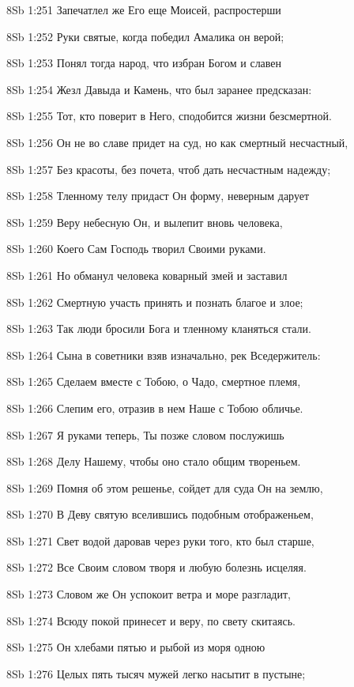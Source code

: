 \vs 8Sb 1:251 Запечатлел же Его еще Моисей, распростерши 

\vs 8Sb 1:252 Руки святые, когда победил Амалика он верой; 

\vs 8Sb 1:253 Понял тогда народ, что избран Богом и славен 

\vs 8Sb 1:254 Жезл Давыда и Камень, что был заранее предсказан: 

\vs 8Sb 1:255 Тот, кто поверит в Него, сподобится жизни безсмертной.

\vs 8Sb 1:256 Он не во славе придет на суд, но как смертный несчастный, 

\vs 8Sb 1:257 Без красоты, без почета, чтоб дать несчастным надежду; 

\vs 8Sb 1:258 Тленному телу придаст Он форму, неверным дарует 

\vs 8Sb 1:259 Веру небесную Он, и вылепит вновь человека,

\vs 8Sb 1:260 Коего Сам Господь творил Своими руками. 

\vs 8Sb 1:261 Но обманул человека коварный змей и заставил 

\vs 8Sb 1:262 Смертную участь принять и познать благое и злое; 

\vs 8Sb 1:263 Так люди бросили Бога и тленному кланяться стали. 

\vs 8Sb 1:264 Сына в советники взяв изначально, рек Вседержитель:

\vs 8Sb 1:265 Сделаем вместе с Тобою, о Чадо, смертное племя, 

\vs 8Sb 1:266 Слепим его, отразив в нем Наше с Тобою обличье. 

\vs 8Sb 1:267 Я руками теперь, Ты позже словом послужишь 

\vs 8Sb 1:268 Делу Нашему, чтобы оно стало общим твореньем. 

\vs 8Sb 1:269 Помня об этом решенье, сойдет для суда Он на землю,

\vs 8Sb 1:270 В Деву святую вселившись подобным отображеньем, 

\vs 8Sb 1:271 Свет водой даровав через руки того, кто был старше, 

\vs 8Sb 1:272 Все Своим словом творя и любую болезнь исцеляя. 

\vs 8Sb 1:273 Словом же Он успокоит ветра и море разгладит, 

\vs 8Sb 1:274 Всюду покой принесет и веру, по свету скитаясь.

\vs 8Sb 1:275 Он хлебами пятью и рыбой из моря одною

\vs 8Sb 1:276 Целых пять тысяч мужей легко насытит в пустыне; 

